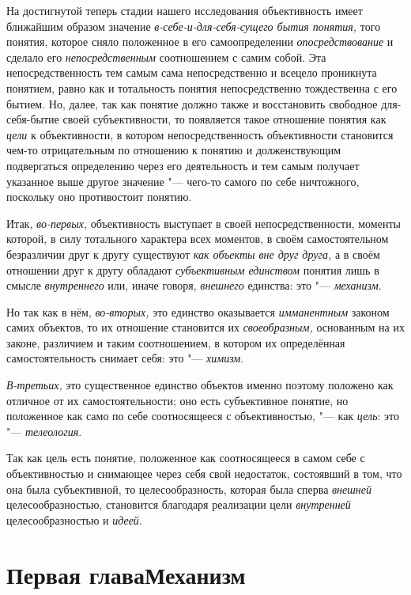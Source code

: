 На достигнутой теперь стадии нашего исследования объективность
имеет ближайшим образом значение {\em в-себе-и-для-себя-сущего бытия
понятия,} того понятия, которое сняло положенное в его
самоопределении {\em опосредствование} и сделало его {\em непосредственным}
соотношением с самим собой. Эта непосредственность тем самым
сама непосредственно и всецело проникнута понятием, равно как и тотальность
понятия непосредственно тождественна с его бытием. Но, далее, так как
понятие должно также и восстановить свободное для-себя-бытие своей
субъективности, то появляется такое отношение понятия как {\em цели} к
объективности, в котором непосредственность объективности становится чем-то
отрицательным по отношению к понятию и долженствующим подвергаться
определению через его деятельность и тем самым получает указанное выше
другое значение "--- чего-то самого по себе ничтожного,
поскольку оно противостоит понятию.

Итак, {\em во-первых,} объективность выступает в своей непосредственности,
моменты которой, в силу тотального характера всех моментов, в своём
самостоятельном безразличии друг к другу существуют {\em как объекты вне друг
друга,} а в своём отношении друг к другу обладают {\em субъективным единством}
понятия лишь в смысле {\em внутреннего} или, иначе говоря, {\em внешнего}
единства: это "--- {\em механизм}.

Но так как в нём, {\em во-вторых,} это единство оказывается {\em имманентным}
законом самих объектов, то их отношение становится их {\em своеобразным,}
основанным на их законе, различием и таким соотношением, в
котором их определённая самостоятельность снимает себя: это "--- {\em химизм}.

{\em В-третьих,} это
существенное единство объектов именно поэтому положено как отличное от их
самостоятельности; оно есть субъективное понятие, но положенное как само по
себе соотносящееся с объективностью, "--- как
{\em цель}: это "--- {\em телеология}.

Так как цель есть понятие, положенное как соотносящееся в
самом себе с объективностью и снимающее через себя свой недостаток,
состоявший в том, что она была субъективной, то целесообразность, которая
была сперва {\em внешней} целесообразностью, становится благодаря реализации
цели {\em внутренней} целесообразностью и {\em идеей}.

\chapter[Первая глава Механизм]{Первая глава\newline Механизм}

